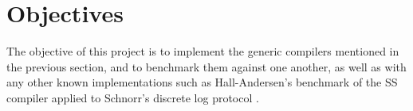 
\section{Objectives}
The objective of this project is to implement the generic compilers mentioned in the previous section, and to benchmark them against one another, as well as with any other known implementations such as Hall-Andersen's benchmark of the SS compiler \cite{StackingSigmas} applied to Schnorr's discrete log protocol \cite{Schnorr}. 

